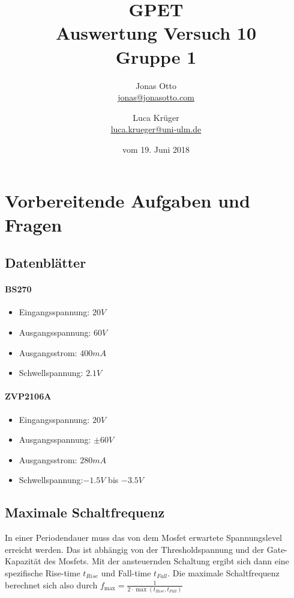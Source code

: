 \documentclass[a4paper]{article}
\title{GPET\\ Auswertung Versuch 10\\ Gruppe 1}
\author{Jonas Otto\\ \href{mailto:jonas@jonasotto.com}{jonas@jonasotto.com} 
   \and Luca Krüger \\ \href{mailto:luca.krueger@uni-ulm.de}{luca.krueger@uni-ulm.de} }
\date{vom 19. Juni 2018}
\newcommand{\vo}{\si{V}}
\newcommand{\ma}{\si{mA}}
\newcommand{\trise}{t_\textit{Rise}}
\newcommand{\tfall}{t_\textit{Fall}}
\begin{document}
\maketitle

\newpage

\section{Vorbereitende Aufgaben und Fragen}
\subsection{Datenblätter}
\paragraph{BS270}
\begin{itemize}
    \item Eingangsspannung: $20\vo$
    \item Ausgangsspannung: $60\vo$
    \item Ausgangsstrom: $400\ma$
    \item Schwellspannung: $2.1\vo$
\end{itemize}

\paragraph{ZVP2106A}
\begin{itemize}
    \item Eingangsspannung: $20\vo$
    \item Ausgangsspannung: $\pm 60\vo$
    \item Ausgangsstrom: $280\ma$
    \item Schwellspannung:$-1.5\vo$ bis $-3.5\vo$
\end{itemize}

\subsection{Maximale Schaltfrequenz}
 In einer Periodendauer muss das von dem Mosfet erwartete Spannungslevel erreicht werden. Das ist abhängig von der Thresholdspannung und der Gate-Kapazität des Mosfets. Mit der ansteuernden Schaltung ergibt sich dann eine spezifische Rise-time $\trise$ und Fall-time $\tfall$.
 Die maximale Schaltfrequenz berechnet sich also durch $f_\text{max}=\frac{1}{2\cdot \max(\trise, \tfall)}$
\end{document}
